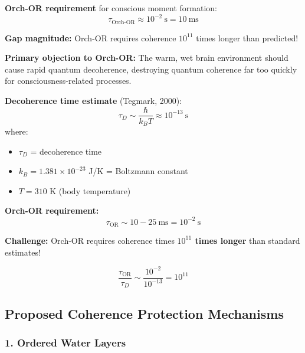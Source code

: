 \textbf{Orch-OR requirement} for conscious moment formation:
\begin{equation}
\label{eq:orchor-time}
\tau_{\text{Orch-OR}} \approx 10^{-2}~\text{s} = 10~\text{ms}
\end{equation}

\textbf{Gap magnitude:} Orch-OR requires coherence $10^{11}$ times longer than predicted!

\begin{warningbox}
\textbf{Primary objection to Orch-OR:} The warm, wet brain environment should cause rapid quantum decoherence, destroying quantum coherence far too quickly for consciousness-related processes.
\end{warningbox}

\textbf{Decoherence time estimate} (Tegmark, 2000):
\begin{equation}
\label{eq:decoherence-time-tegmark}
\tau_D \sim \frac{\hbar}{k_B T} \approx 10^{-13}~\text{s}
\end{equation}
where:
\begin{itemize}
\item $\tau_D$ = decoherence time
\item $k_B = 1.381 \times 10^{-23}$ J/K = Boltzmann constant
\item $T = 310$ K (body temperature)
\end{itemize}

\textbf{Orch-OR requirement:}
\begin{equation}
\label{eq:orch-or-time}
\tau_{\text{OR}} \sim 10-25~\text{ms} = 10^{-2}~\text{s}
\end{equation}

\textbf{Challenge:} Orch-OR requires coherence times \textbf{$10^{11}$ times longer} than standard estimates!

\begin{equation}
\label{eq:coherence-gap}
\frac{\tau_{\text{OR}}}{\tau_D} \sim \frac{10^{-2}}{10^{-13}} = 10^{11}
\end{equation}

\subsection{Proposed Coherence Protection Mechanisms}

\subsubsection{1. Ordered Water Layers}


